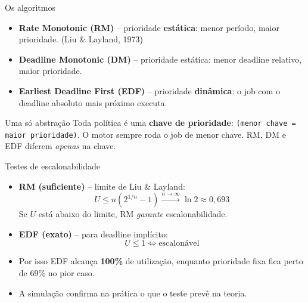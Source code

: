 \documentclass[aspectratio=169,xcolor=table]{beamer}
\begin{document}
\begin{frame}{Os algoritmos}
    \begin{itemize}
        \item \textbf{Rate Monotonic (RM)} -- prioridade \textbf{estática}: menor período, maior prioridade. (Liu \& Layland, 1973)
        \item \textbf{Deadline Monotonic (DM)} -- prioridade estática: menor deadline relativo, maior prioridade.
        \item \textbf{Earliest Deadline First (EDF)} -- prioridade \textbf{dinâmica}: o job com o deadline absoluto mais próximo executa.
    \end{itemize}
    \vspace{0.3em}
    \begin{block}{Uma só abstração}
        Toda política é uma \textbf{chave de prioridade}: \texttt{(menor chave = maior prioridade)}.
        O motor sempre roda o job de menor chave. RM, DM e EDF diferem \emph{apenas} na chave.
    \end{block}
\end{frame}

\begin{frame}{Testes de escalonabilidade}
    \begin{itemize}
        \item \textbf{RM (suficiente)} -- limite de Liu \& Layland:
        \[
            U \le n\left(2^{1/n}-1\right) \xrightarrow{n\to\infty} \ln 2 \approx 0{,}693
        \]
        Se $U$ está abaixo do limite, RM \emph{garante} escalonabilidade.
        \item \textbf{EDF (exato)} -- para deadline implícito:
        \[
            U \le 1 \iff \text{escalonável}
        \]
        \item Por isso EDF alcança \textbf{100\%} de utilização, enquanto prioridade fixa fica perto de 69\% no pior caso.
        \item A simulação confirma na prática o que o teste prevê na teoria.
    \end{itemize}
\end{frame}

\end{document}
